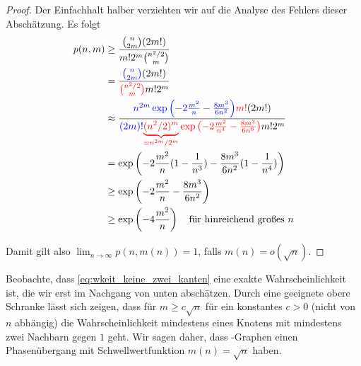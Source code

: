 \begin{proof}
    Der Einfachhalt halber verzichten wir auf die Analyse des Fehlers dieser Abschätzung.
    Es folgt
    \begin{align}
        p(n, m)
         & \ge \frac{\binom{n}{2m} (2m!)}{m! 2^m \binom{n^2/2}{m}}                                                                                   \\
         & = \frac{\textcolor{blue}{\binom{n}{2m}}(2m!)}{\textcolor{red}{\binom{n^2/2}{m}} m! 2^m}                                                   \\
         & \approx \frac{
        \textcolor{blue}{n^{2m} \exp\left(-2\frac{m^2}{n} - \frac{8m^3}{6n^2}\right)}\textcolor{red}{m!}(2m!)
        }{
        \textcolor{blue}{(2m)!}\textcolor{red}{\underbrace{(n^2/2)^m}_{=n^{2m} / 2^m} \exp\left(-2\frac{m^2}{n^4} - \frac{8m^3}{6n^6}\right)} m!2^m} \\
         & = \exp\left(-2\frac{m^2}{n} (1 - \frac{1}{n^3}) - \frac{8m^3}{6n^2} (1 - \frac{1}{n^4}) \right)                                           \\
         & \ge \exp\left(-2\frac{m^2}{n} - \frac{8m^3}{6n^2} \right)                                                                                 \\
         & \ge \exp\left(-4\frac{m^2}{n} \right) \quad \text{für hinreichend großes $n$}
    \end{align}

    Damit gilt also $\lim_{n \to \infty} p(n, m(n)) = 1$, falls $m(n) = o(\sqrt{n})$.
\end{proof}

Beobachte, dass \cref{eq:wkeit_keine_zwei_kanten} eine exakte Wahrscheinlichkeit ist, die wir erst im Nachgang von unten abschätzen.
Durch eine geeignete obere Schranke lässt sich zeigen, dass für $m \ge c \sqrt n$ für ein konstantes $c > 0$ (\dh nicht von $n$ abhängig) die Wahrscheinlichkeit mindestens eines Knotens mit mindestens zwei Nachbarn gegen $1$ geht.
Wir sagen daher, dass \Gnm-Graphen einen Phasenübergang mit Schwellwertfunktion $m(n) = \sqrt n$ haben.


\bigskip

